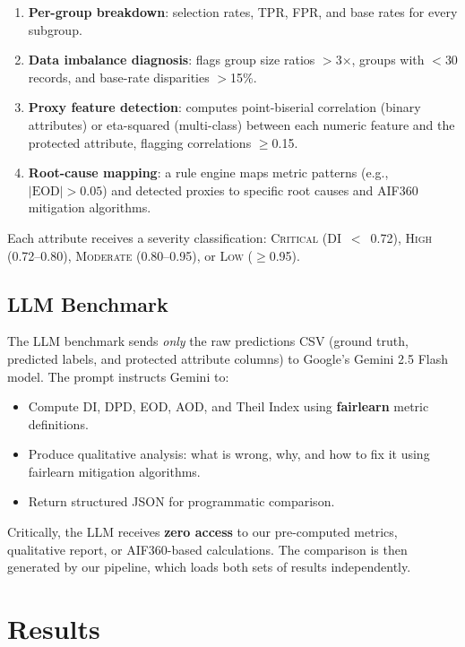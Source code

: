 \documentclass[11pt,a4paper]{article}
\begin{document}
\begin{enumerate}[nosep]
  \item \textbf{Per-group breakdown}: selection rates, TPR, FPR, and base
        rates for every subgroup.
  \item \textbf{Data imbalance diagnosis}: flags group size ratios
        $>$3$\times$, groups with $<$30 records, and base-rate disparities
        $>$15\%.
  \item \textbf{Proxy feature detection}: computes point-biserial
        correlation (binary attributes) or eta-squared (multi-class) between
        each numeric feature and the protected attribute, flagging
        correlations $\geq$0.15.
  \item \textbf{Root-cause mapping}: a rule engine maps metric patterns
        (e.g., $|\text{EOD}| > 0.05$) and detected proxies to specific root
        causes and AIF360 mitigation algorithms.
\end{enumerate}

Each attribute receives a severity classification: \textsc{Critical}
(DI~$<$~0.72), \textsc{High} (0.72--0.80), \textsc{Moderate} (0.80--0.95),
or \textsc{Low} ($\geq$0.95).

\subsection{LLM Benchmark}

The LLM benchmark sends \emph{only} the raw predictions CSV (ground truth,
predicted labels, and protected attribute columns) to Google's Gemini 2.5
Flash model. The prompt instructs Gemini to:
\begin{itemize}[nosep]
  \item Compute DI, DPD, EOD, AOD, and Theil Index using \textbf{fairlearn}
        metric definitions.
  \item Produce qualitative analysis: what is wrong, why, and how to fix it
        using fairlearn mitigation algorithms.
  \item Return structured JSON for programmatic comparison.
\end{itemize}
Critically, the LLM receives \textbf{zero access} to our pre-computed
metrics, qualitative report, or AIF360-based calculations. The comparison
is then generated by our pipeline, which loads both sets of results
independently.

\section{Results}
\end{document}
